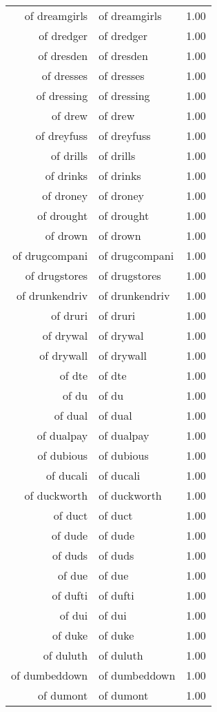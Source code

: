 \begin{table}[ht]
\begin{tabular}{rlr}
  of dreamgirls & of dreamgirls & 1.00 \\ 
  of dredger & of dredger & 1.00 \\ 
  of dresden & of dresden & 1.00 \\ 
  of dresses & of dresses & 1.00 \\ 
  of dressing & of dressing & 1.00 \\ 
  of drew & of drew & 1.00 \\ 
  of dreyfuss & of dreyfuss & 1.00 \\ 
  of drills & of drills & 1.00 \\ 
  of drinks & of drinks & 1.00 \\ 
  of droney & of droney & 1.00 \\ 
  of drought & of drought & 1.00 \\ 
  of drown & of drown & 1.00 \\ 
  of drugcompani & of drugcompani & 1.00 \\ 
  of drugstores & of drugstores & 1.00 \\ 
  of drunkendriv & of drunkendriv & 1.00 \\ 
  of druri & of druri & 1.00 \\ 
  of drywal & of drywal & 1.00 \\ 
  of drywall & of drywall & 1.00 \\ 
  of dte & of dte & 1.00 \\ 
  of du & of du & 1.00 \\ 
  of dual & of dual & 1.00 \\ 
  of dualpay & of dualpay & 1.00 \\ 
  of dubious & of dubious & 1.00 \\ 
  of ducali & of ducali & 1.00 \\ 
  of duckworth & of duckworth & 1.00 \\ 
  of duct & of duct & 1.00 \\ 
  of dude & of dude & 1.00 \\ 
  of duds & of duds & 1.00 \\ 
  of due & of due & 1.00 \\ 
  of dufti & of dufti & 1.00 \\ 
  of dui & of dui & 1.00 \\ 
  of duke & of duke & 1.00 \\ 
  of duluth & of duluth & 1.00 \\ 
  of dumbeddown & of dumbeddown & 1.00 \\ 
  of dumont & of dumont & 1.00 \\ 

\end{tabular}
\end{table}
